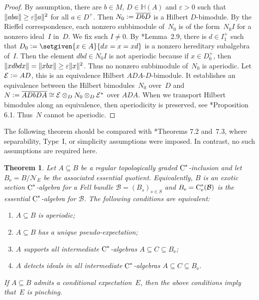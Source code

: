 \documentclass[a4paper]{amsart}
\theoremstyle{plain}
\newtheorem{theorem}{Theorem}
\theoremstyle{definition}
\theoremstyle{remark}
\numberwithin{theorem}{section}
\numberwithin{equation}{section}
\newcommand{\Her}{\mathbb H}%
\newcommand*{\nb}{\nobreakdash}
\newcommand*{\Null}{\mathcal N}%
\newcommand*{\ess}{\mathrm{e}}%
\newcommand*{\Cst}{\textup C^*}%
\newcommand*{\Hilm}[1][E]{\mathcal #1}%
\newcommand*{\B}{\mathcal B}%
\newcommand*{\defeq}{\mathrel{\vcentcolon=}}%
\DeclarePairedDelimiter{\norm}{\lVert}{\rVert}%
\begin{document}
\begin{proof}
  By assumption, there are \(b\in M\), \(D\in \Her(A)\) and
  \(\varepsilon >0\) such that \(\norm{a b a} \ge \varepsilon
  \norm{a}^2\) for all \(a\in D^+\).
  Then \(N_0\defeq\overline{D b D}\) is a Hilbert \(D\)\nb-bimodule.
  By the Rieffel correspondence, each nonzero subbimodule of~\(N_0\)
  is of the form~\(N_0I\) for a nonzero ideal~\(I\) in~\(D\).
  We fix such \(I\neq 0\).
  By \cite{Kwasniewski-Meyer:Aperiodicity}*{Lemma~2.9},
  there is \(d\in I^+_1\) such that \(D_0\defeq \setgiven{x\in A}{d x=
    x = x d}\) is a nonzero hereditary subalgebra of~\(I\).
  Then the element \(d b d\in N_0 I\) is not aperiodic because if
  \(x\in D_0^+\), then \(\norm{x dbdx}=\norm{xbx}\ge \varepsilon
  \norm{x}^2\).
  Thus no nonzero subbimodule of~\(N_0\) is aperiodic.
  Let \(\Hilm\defeq AD\), this is an equivalence Hilbert
  \(ADA\)-\(D\)-bimodule.
  It establishes an equivalence between the Hilbert bimodules~\(N_0\)
  over~\(D\) and \(N\defeq \overline{A D b D A}\cong \Hilm \otimes_D
  N_0 \otimes_D \Hilm^*\) over \(A D A\).
  When we transport Hilbert bimodules along an equivalence, then
  aperiodicity is preserved, see
  \cite{Kwasniewski-Meyer:Aperiodicity}*{Proposition 6.1}.
  Thus~\(N\) cannot be aperiodic.
\end{proof}

The following theorem should be compared with
\cite{Kwasniewski-Meyer:Aperiodicity_pseudo_expectations}*{Theorems
  7.2 and~7.3}, where separability, Type~I, or simplicity assumptions
were imposed.
In contrast, no such assumptions are required here.

\begin{theorem}
  \label{thm:topologically_graded_aperiodic}
  Let \(A\subseteq B\) be a regular topologically graded
  \(\Cst\)\nb-inclusion and let \(B_\ess=B/\Null_E\) be the associated
  essential quotient.
  Equivalently, \(B\) is an exotic section \(\Cst\)\nb-algebra for a
  Fell bundle \(\B=(B_{s})_{s\in S}\) and \(B_\ess=\Cst_\ess(\B)\) is
  the essential \(\Cst\)\nb-algebra for \(\B\).
  The following conditions are equivalent:
  \begin{enumerate}
  \item \label{cor:topologically_graded_aperiodic1}%
    \(A\subseteq B\)  is aperiodic;
  \item \label{cor:topologically_graded_aperiodic2}%
    \(A\subseteq B\) has a unique pseudo-expectation;
  \item \label{cor:topologically_graded_aperiodic3}%
    \(A\) supports all intermediate \(\Cst\)\nb-algebras \(A\subseteq
    C\subseteq B_\ess\);
  \item \label{cor:topologically_graded_aperiodic4}%
    \(A\) detects  ideals in all intermediate \(\Cst\)\nb-algebras
    \(A\subseteq C \subseteq B_\ess\).
  \end{enumerate}
  If \(A\subseteq B\) admits a conditional expectation~\(E\), then
  the above conditions imply that~\(E\) is pinching.
\end{theorem}
\end{document}
